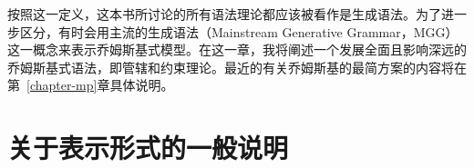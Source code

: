 按照这一定义，这本书所讨论的所有语法理论都应该被看作是生成语法。为了进一步区分，有时会用主流的生成语法（Mainstream Generative Grammar，MGG）这一概念\citep[]{CJ2005a}来表示乔姆斯基式模型。在这一章，我将阐述一个发展全面且影响深远的乔姆斯基式语法，即管辖和约束理论。最近的有关乔姆斯基的最简方案的内容将在第~\ref{chapter-mp}章具体说明。

\section{关于表示形式的一般说明}
\label{Abschnitt-GB-allgemein}

